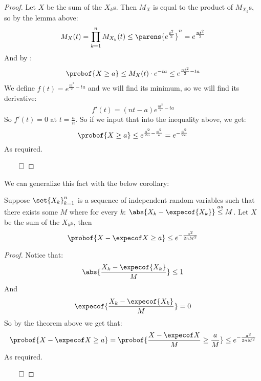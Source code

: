 \begin{proof}

	Let $X$ be the sum of the $X_k$s.
	Then $M_X$ is equal to the product of $M_{X_k}$s, so by the lemma above:
	\[ M_X(t) = \prod_{k=1}^n M_{X_k}(t) \leq \parens{e^{\frac{t^2}2}}^n = e^{\frac{nt^2}2} \]
	And by :
	\[ \probof{X\geq a}\leq M_X(t)\cdot e^{-ta} \leq e^{\frac{nt^2}2-ta} \]
	We define $f(t)=e^{\frac{nt^2}2-ta}$ and we will find its minimum, so we will find its derivative:
	\[ f'(t) = (nt-a)e^{\frac{nt^2}2-ta} \]
	So $f'(t)=0$ at $t=\frac an$.
	So if we input that into the inequality above, we get:
	\[ \probof{X\geq a}\leq e^{\frac{a^2}{2n}-\frac{a^2}n} = e^{-\frac{a^2}{2n}} \]
	As required.

	\hfill$\qed$

\end{proof}

We can generalize this fact with the below corollary:

\begin{coro*}

	Suppose $\set{X_k}_{k=1}^n$ is a sequence of independent random variables such that there exists some $M$ where for every $k$:
	$\abs{X_k-\expecof{X_k}}\asleq M$.
	Let $X$ be the sum of the $X_k$s, then
	\[ \probof{X-\expecof X\geq a}\leq e^{-\frac{a^2}{2nM^2}} \]

\end{coro*}

\begin{proof}

	Notice that:
	\[ \abs{\frac{X_k-\expecof{X_k}}M}\leq 1 \]
	And
	\[ \expecof{\frac{X_k-\expecof{X_k}}M} = 0 \]
	So by the theorem above we get that:
	\[ \probof{X-\expecof X\geq a} = \probof{\frac{X-\expecof X}M\geq\frac aM} \leq e^{-\frac{a^2}{2nM^2}} \]
	As required.

	\hfill$\qed$

\end{proof}

